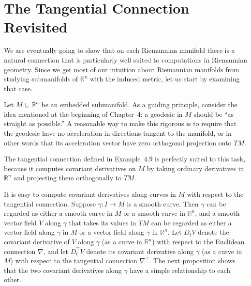 \section{The Tangential Connection Revisited}

We are eventually going to show that on each Riemannian manifold there is a natural connection that is particularly well suited to computations in Riemannian geometry. Since we get most of our intuition about Riemannian manifolds from studying submanifolds of $\mathbb{R}^n$ with the induced metric, let us start by examining that case.

Let $M \subseteq \mathbb{R}^n$ be an embedded submanifold. As a guiding principle, consider the idea mentioned at the beginning of Chapter~4: a geodesic in $M$ should be ``as straight as possible.'' A reasonable way to make this rigorous is to require that the geodesic have no acceleration in directions tangent to the manifold, or in other words that its acceleration vector have zero orthogonal projection onto $TM$.

The tangential connection defined in Example~4.9 is perfectly suited to this task, because it computes covariant derivatives on $M$ by taking ordinary derivatives in $\mathbb{R}^n$ and projecting them orthogonally to $TM$.

It is easy to compute covariant derivatives along curves in $M$ with respect to the tangential connection. Suppose $\gamma: I \to M$ is a smooth curve. Then $\gamma$ can be regarded as either a smooth curve in $M$ or a smooth curve in $\mathbb{R}^n$, and a smooth vector field $V$ along $\gamma$ that takes its values in $TM$ can be regarded as either a vector field along $\gamma$ in $M$ or a vector field along $\gamma$ in $\mathbb{R}^n$. Let $\overline{D}_t V$ denote the covariant derivative of $V$ along $\gamma$ (as a curve in $\mathbb{R}^n$) with respect to the Euclidean connection $\overline{\nabla}$, and let $D_t^\top V$ denote its covariant derivative along $\gamma$ (as a curve in $M$) with respect to the tangential connection $\nabla^\top$. The next proposition shows that the two covariant derivatives along $\gamma$ have a simple relationship to each other.

